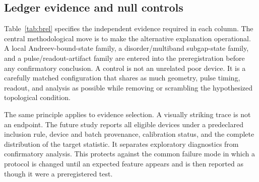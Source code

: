 \documentclass[conference]{IEEEtran}
\begin{document}
\subsection{Ledger evidence and null controls}

Table~\ref{tab:brel} specifies the independent evidence required in each column. The central methodological move is to make the alternative explanation operational. A local Andreev-bound-state family, a disorder/multiband subgap-state family, and a pulse/readout-artifact family are entered into the preregistration before any confirmatory conclusion. A control is not an unrelated poor device. It is a carefully matched configuration that shares as much geometry, pulse timing, readout, and analysis as possible while removing or scrambling the hypothesized topological condition.

The same principle applies to evidence selection. A visually striking trace is not an endpoint. The future study reports all eligible devices under a predeclared inclusion rule, device and batch provenance, calibration status, and the complete distribution of the target statistic. It separates exploratory diagnostics from confirmatory analysis. This protects against the common failure mode in which a protocol is changed until an expected feature appears and is then reported as though it were a preregistered test.
\end{document}
